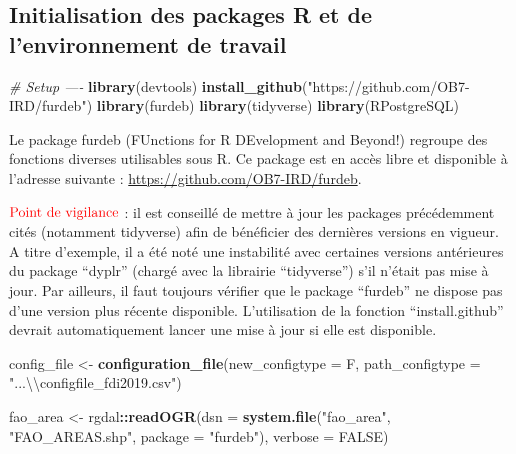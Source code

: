 \documentclass[]{article}
\newenvironment{Shaded}{\begin{snugshade}}{\end{snugshade}}
\newcommand{\CharTok}[1]{\textcolor[rgb]{0.31,0.60,0.02}{#1}}
\newcommand{\CommentTok}[1]{\textcolor[rgb]{0.56,0.35,0.01}{\textit{#1}}}
\newcommand{\DataTypeTok}[1]{\textcolor[rgb]{0.13,0.29,0.53}{#1}}
\newcommand{\KeywordTok}[1]{\textcolor[rgb]{0.13,0.29,0.53}{\textbf{#1}}}
\newcommand{\NormalTok}[1]{#1}
\newcommand{\OperatorTok}[1]{\textcolor[rgb]{0.81,0.36,0.00}{\textbf{#1}}}
\newcommand{\OtherTok}[1]{\textcolor[rgb]{0.56,0.35,0.01}{#1}}
\newcommand{\StringTok}[1]{\textcolor[rgb]{0.31,0.60,0.02}{#1}}
\begin{document}
\hypertarget{initialisation-des-packages-r-et-de-lenvironnement-de-travail}{%
\subsection{Initialisation des packages R et de l'environnement de
travail}\label{initialisation-des-packages-r-et-de-lenvironnement-de-travail}}

\begin{Shaded}
\begin{Highlighting}[]
\CommentTok{# Setup ----}
\KeywordTok{library}\NormalTok{(devtools)}
\KeywordTok{install_github}\NormalTok{(}\StringTok{"https://github.com/OB7-IRD/furdeb"}\NormalTok{)}
\KeywordTok{library}\NormalTok{(furdeb)}
\KeywordTok{library}\NormalTok{(tidyverse)}
\KeywordTok{library}\NormalTok{(RPostgreSQL)}
\end{Highlighting}
\end{Shaded}

Le package furdeb (FUnctions for R DEvelopment and Beyond!) regroupe des
fonctions diverses utilisables sous R. Ce package est en accès libre et
disponible à l'adresse suivante :
\url{https://github.com/OB7-IRD/furdeb}.

\textbf{\(\color{red}{\text{Point de vigilance}}\)} : il est conseillé
de mettre à jour les packages précédemment cités (notamment tidyverse)
afin de bénéficier des dernières versions en vigueur. A titre d'exemple,
il a été noté une instabilité avec certaines versions antérieures du
package ``dyplr'' (chargé avec la librairie ``tidyverse'') s'il n'était
pas mise à jour. Par ailleurs, il faut toujours vérifier que le package
``furdeb'' ne dispose pas d'une version plus récente disponible.
L'utilisation de la fonction ``install.github'' devrait automatiquement
lancer une mise à jour si elle est disponible.

\begin{Shaded}
\begin{Highlighting}[]
\NormalTok{config_file <-}\StringTok{ }\KeywordTok{configuration_file}\NormalTok{(}\DataTypeTok{new_configtype =}\NormalTok{ F, }
    \DataTypeTok{path_configtype =} \StringTok{"...}\CharTok{\textbackslash{}\textbackslash{}}\StringTok{configfile_fdi2019.csv"}\NormalTok{)}

\NormalTok{fao_area <-}\StringTok{ }\NormalTok{rgdal}\OperatorTok{::}\KeywordTok{readOGR}\NormalTok{(}\DataTypeTok{dsn =} \KeywordTok{system.file}\NormalTok{(}\StringTok{"fao_area"}\NormalTok{, }
    \StringTok{"FAO_AREAS.shp"}\NormalTok{, }\DataTypeTok{package =} \StringTok{"furdeb"}\NormalTok{), }
    \DataTypeTok{verbose =} \OtherTok{FALSE}\NormalTok{)}
\end{Highlighting}
\end{Shaded}
\end{document}
